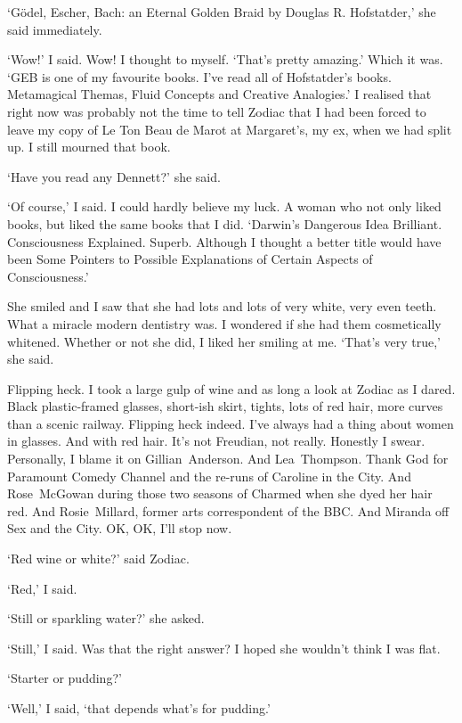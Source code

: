 `{\twelvesl Gödel, Escher, Bach: an Eternal Golden Braid} by
Douglas R. Hofstatder,' she said immediately.

`Wow!' I said. Wow! I thought to myself. `That's pretty
amazing.' Which it was. `{\twelvesl GEB\/} is one of my favourite books. I've read
all of Hofstatder's books. {\twelvesl Metamagical Themas},
{\twelvesl Fluid Concepts and Creative Analogies.}' I realised that
right now was probably not the time to tell Zodiac that I had been
forced to leave my copy of {\twelvesl Le Ton Beau de Marot\/} at
Margaret's, my ex, when we had split up. I still mourned that book.

`Have you read any Dennett?' she said.

`Of course,' I said. I could hardly believe my luck. A woman who
not only liked books, but liked the same books that I did.
`{\twelvesl Darwin's Dangerous Idea} Brilliant. {\twelvesl
Consciousness Explained}. Superb. Although I thought a better title
would have been {\twelvesl Some Pointers to Possible Explanations of
Certain Aspects of Consciousness}.'

She smiled and I saw that she had lots and lots of very white, very
even teeth. What a miracle modern dentistry was. I wondered if she
had them cosmetically whitened. Whether or not she did, I liked her
smiling at me. `That's very true,' she said.

Flipping heck. I took a large gulp of wine and as long a look at
Zodiac as I dared. Black plastic-framed glasses, short-ish skirt,
tights, lots of red hair, more curves than a scenic railway. Flipping heck
indeed. I've always had a thing about women in glasses. And with red
hair. It's not Freudian, not really. Honestly I swear. Personally, I
blame it on Gillian~Anderson. And Lea~Thompson. Thank God for
Paramount Comedy Channel and the re-runs of {\twelvesl Caroline in
the City}. And Rose~McGowan during those two seasons of {\twelvesl
Charmed\/} when she dyed her hair red. And Rosie~Millard, former
arts correspondent of the BBC. And Miranda off {\twelvesl Sex and
the City\/}. OK, OK, I'll stop now.

`Red wine or white?' said Zodiac.

`Red,' I said.

`Still or sparkling water?' she asked.

`Still,' I said. Was that the right answer? I hoped she wouldn't
think I was flat.

`Starter or pudding?'

`Well,' I said, `that depends what's for pudding.'

